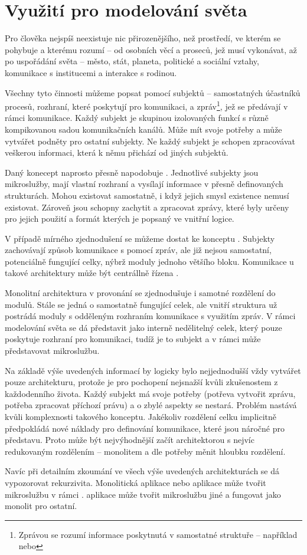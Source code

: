 \section{Využití  pro modelování světa}\label{sec:msa-model-of-world}

Pro člověka nejspíš neexistuje nic přirozenějšího, než prostředí, ve kterém se pohybuje a kterému rozumí – od osobních věcí a proseců, jež musí vykonávat, až po uspořádání světa – město, stát, planeta, politické a sociální vztahy, komunikace s institucemi a interakce s rodinou.

Všechny tyto činnosti můžeme popsat pomocí subjektů – samostatných účastníků procesů, rozhraní, které poskytují pro komunikaci, a zpráv\footnote{Zprávou se rozumí informace poskytnutá v samostatné struktuře – například  nebo }, jež se předávají v rámci komunikace.
Každý subjekt je skupinou izolovaných funkcí s různě kompikovanou sadou komunikačních kanálů.
Může mít svoje potřeby a může vytvářet podněty pro ostatní subjekty.
Ne každý subjekt je schopen zpracovávat veškerou informaci, která k němu přichází od jiných subjektů.

Daný konecept naprosto přesně napodobuje .
Jednotlivé subjekty jsou mikroslužby, mají vlastní rozhraní a vysílají informace v přesně definovaných strukturách.
Mohou existovat samostatně, i když jejich smysl existence nemusí existovat.
Zároveň jsou schopny zachytit a zpracovat zprávy, které byly určeny pro jejich použití a formát kterých je popsaný ve vnitřní logice.

V případě mírného zjednodušení se můžeme dostat ke konceptu .
Subjekty zachovávají způsob komunikace s pomocí zpráv, ale již nejsou samostatní, potenciálně fungující celky, nýbrž moduly jednoho většího bloku.
Komunikace u takové architektury může být centrállně řízena .\cite{soavsmsa}

Monolitní architektura v provonání se  zjednodušuje i samotné rozdělení do modulů.
Stále se jedná o samostatně fungující celek, ale vnitří struktura už postrádá moduly s odděleným rozhraním komunikace s využitím zpráv.
V rámci modelování světa se dá představit jako interně nedělitelný celek, který pouze poskytuje rozhraní pro komunikaci, tudíž je to subjekt a v rámci  může představovat mikroslužbu.

Na základě výše uvedených informací by logicky bylo nejjednodušší vždy vytvářet pouze  architekturu, protože je pro pochopení nejsnažší kvůli zkušenostem z každodenního života.
Každý subjekt má svoje potřeby (potřeva vytvořit zprávu, potřeba zpracovat příchozí právu) a o zbylé aspekty se nestará.
Problém nastává kvůli komplexnosti takového konceptu.
Jakékoliv rozdělení celku implicitně předpokládá nové náklady pro definování komunikace, které jsou náročné pro představu.
Proto může být nejvýhodnější začít architektorou s nejvíc redukovaným rozdělením – monolitem a dle potřeby měnit hloubku rozdělení.

Navíc při detailním zkoumání ve všech výše uvedených architekturách se dá vypozorovat rekurzivita.
Monolitická aplikace nebo  aplikace může tvořit mikroslužbu v rámci .
 aplikace může tvořit mikroslužbu jiné  a fungovat jako monolit pro ostatní.
